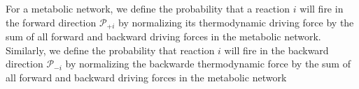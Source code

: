For a metabolic network, we define the probability that a reaction $i$ will fire in the forward  direction ${\mathcal P_{+i}}$ by normalizing its thermodynamic driving force by the sum of all forward and backward driving forces in the metabolic network. Similarly, we define the probability that reaction $i$ will fire in the backward direction $\mathcal P_{-i}$ by normalizing the backwarde thermodynamic force by  the sum of all forward and backward driving forces in the metabolic network